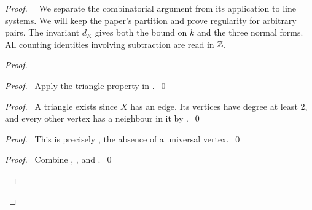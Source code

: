 \begin{proof}
 \pfsketch\ \new\ We separate the combinatorial argument from its application to
 line systems. We will keep the paper's partition and prove regularity for arbitrary
 pairs. The invariant $d_K$ gives both the bound on $k$ and the three normal forms.
 All counting identities involving subtraction are read in ${\mathbb Z}$.

 \begin{proof}
  \begin{proof}\pf\ Apply the triangle property in .~\qed\end{proof}
  \begin{proof}
   \pf\ A triangle exists since $X$ has an edge. Its vertices have degree at least 2,
   and every other vertex has a neighbour in it by .~\qed
  \end{proof}
  \begin{proof}
   \pf\ This is precisely , the absence of a universal vertex.~\qed
  \end{proof}
  \qedstep
  \begin{proof}\pf\ Combine , , and .~\qed\end{proof}
 \end{proof}


\end{proof}
